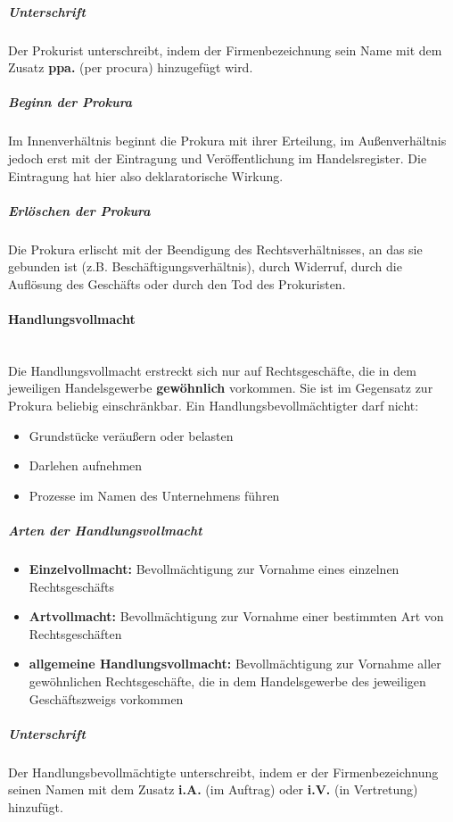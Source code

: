\subparagraph{Unterschrift} Der Prokurist unterschreibt, indem der Firmenbezeichnung sein Name mit dem Zusatz    {\bf ppa.} (per procura) hinzugefügt wird.
	
\subparagraph{Beginn der Prokura} Im Innenverhältnis beginnt die Prokura mit ihrer Erteilung, im Außenverhältnis jedoch erst mit der Eintragung und Veröffentlichung im Handelsregister. Die Eintragung hat hier also deklaratorische Wirkung.
	
\subparagraph{Erlöschen der Prokura} Die Prokura erlischt mit der Beendigung des Rechtsverhältnisses, an das sie gebunden ist (z.B. Beschäftigungsverhältnis), durch Widerruf, durch die Auflösung des Geschäfts oder durch den Tod des Prokuristen.
	
\paragraph{Handlungsvollmacht}~\\
Die Handlungsvollmacht erstreckt sich nur auf Rechtsgeschäfte, die in dem jeweiligen Handelsgewerbe {\bf gewöhnlich} vorkommen. Sie ist im Gegensatz zur Prokura beliebig einschränkbar. Ein Handlungsbevollmächtigter darf nicht:

\begin{itemize}
\setlength\itemsep{0em}
	\item Grundstücke veräußern oder belasten
	\item Darlehen aufnehmen
	\item Prozesse im Namen des Unternehmens führen
\end{itemize}
	
\subparagraph{Arten der Handlungsvollmacht}
\begin{itemize}
\setlength\itemsep{0em}
	\item {\bf Einzelvollmacht:} Bevollmächtigung zur Vornahme eines einzelnen Rechtsgeschäfts
	\item {\bf Artvollmacht:} Bevollmächtigung zur Vornahme einer bestimmten Art von Rechtsgeschäften
	\item {\bf allgemeine Handlungsvollmacht:} Bevollmächtigung zur Vornahme aller gewöhnlichen Rechtsgeschäfte, die in dem Handelsgewerbe des jeweiligen Geschäftszweigs vorkommen
\end{itemize}
	
\subparagraph{Unterschrift} Der Handlungsbevollmächtigte unterschreibt, indem er der Firmenbezeichnung seinen Namen mit dem Zusatz {\bf i.A.} (im Auftrag) oder {\bf i.V.} (in Vertretung) hinzufügt.
	
